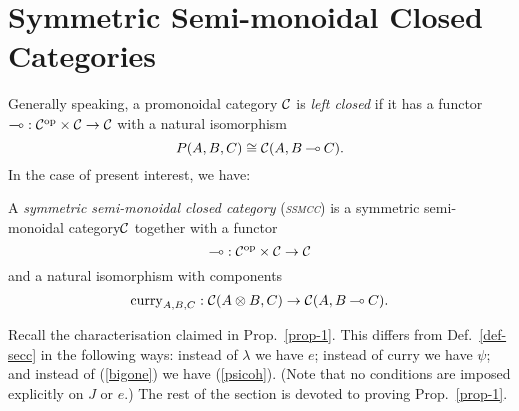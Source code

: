 \documentclass{robincs}
\let\defn = \emph
\newcommand\curry{\mathrm{curry}}
\newcommand\pref[1]{\textup(\ref{#1}\textup)}
\newcommand\ssmc  {symmetric semi-mon\-oid\-al category\xspace}
\newcommand\ssmcc {symmetric semi-mon\-oid\-al closed category\xspace}
\newcommand\Ssmccs{Symmetric Semi-mon\-oid\-al Closed Categories\xspace}
\newcommand\SECC {\textsc{ssmcc}\xspace}
\begin{document}
\section{\Ssmccs}\label{s-secc}
Generally speaking, a promonoidal category $\mathcal{C}$ is \defn{left closed}
if it has a functor $\mathbin{\multimap}:\mathcal{C}^\mathrm{op}\times\mathcal{C}\to\mathcal{C}$ with a natural
isomorphism
\[
    P(A,B,C) \cong \mathcal{C}(A, B\mathbin{\multimap} C).
\]
In the case of present interest, we have:
\begin{definition}\label{def-secc}
        A \defn{\ssmcc} (\defn{\SECC})
        is a \ssmc $\mathcal{C}$ together with a functor
        \[
                \mathbin{\multimap}:\mathcal{C}^\mathrm{op}\times\mathcal{C}\to\mathcal{C}
        \]
        and a natural isomorphism with components
        \[
                \curry_{A,B,C}:\C(A\tn B, C)\to\C(A, B\lolli C).
        \]
\end{definition}
%
%
Recall the characterisation claimed in Prop.~\ref{prop-1}.
This differs from Def.~\ref{def-secc} in the following ways:
instead of $\lambda$ we have $e$;
instead of $\curry$ we have $\psi$; and
instead of \pref{bigone} we have \pref{psicoh}.
(Note that no conditions are imposed explicitly on $J$ or $e$.)
The rest of the section is devoted to proving Prop.~\ref{prop-1}.
\end{document}
